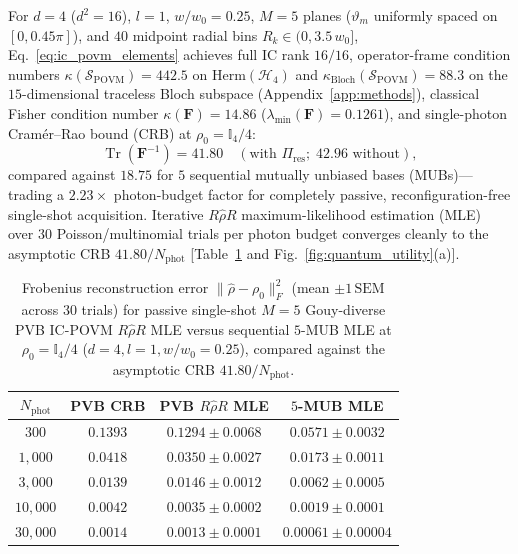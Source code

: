 \documentclass[aps,pra,onecolumn,notitlepage,11pt,tightenlines,nofootinbib,floatfix,longbibliography]{revtex4-2}
\newcommand{\norm}[1]{\lVert #1 \rVert}
\begin{document}
For $d = 4$ ($d^2 = 16$), $l = 1$, $w/w_0 = 0.25$, $M = 5$ planes ($\vartheta_m$ uniformly spaced on $[0, 0.45\pi]$), and $40$ midpoint radial bins $R_k \in (0, 3.5\,w_0]$, Eq.~\eqref{eq:ic_povm_elements} achieves full IC rank $16/16$, operator-frame condition numbers $\kappa(\mathcal{S}_{\mathrm{POVM}}) = 442.5$ on $\mathrm{Herm}(\mathcal{H}_4)$ and $\kappa_{\mathrm{Bloch}}(\mathcal{S}_{\mathrm{POVM}}) = 88.3$ on the $15$-dimensional traceless Bloch subspace (Appendix~\ref{app:methods}), classical Fisher condition number $\kappa(\mathbf{F}) = 14.86$ ($\lambda_{\min}(\mathbf{F}) = 0.1261$), and single-photon Cram\'er--Rao bound (CRB) at $\rho_0 = \mathbb{I}_4/4$:
\begin{equation}
\operatorname{Tr}\!\left(\mathbf{F}^{-1}\right) = 41.80 \quad (\text{with }\Pi_{\mathrm{res}};\; 42.96\text{ without}),
\label{eq:fisher_crb}
\end{equation}
compared against $18.75$ for $5$ sequential mutually unbiased bases (MUBs)---trading a $2.23\times$ photon-budget factor for completely passive, reconfiguration-free single-shot acquisition. Iterative $R\hat{\rho}R$ maximum-likelihood estimation (MLE)~\cite{Lvovsky2004} over $30$ Poisson/multinomial trials per photon budget converges cleanly to the asymptotic CRB $41.80/N_{\mathrm{phot}}$ [Table~\ref{tab:povm_mle} and Fig.~\ref{fig:quantum_utility}(a)].

\begin{table}[t]
\caption{Frobenius reconstruction error $\norm{\hat{\rho} - \rho_0}_F^2$ (mean $\pm 1\,\mathrm{SEM}$ across $30$ trials) for passive single-shot $M = 5$ Gouy-diverse PVB IC-POVM $R\hat{\rho}R$ MLE versus sequential $5$-MUB MLE at $\rho_0 = \mathbb{I}_4/4$ ($d = 4, l = 1, w/w_0 = 0.25$), compared against the asymptotic CRB $41.80/N_{\mathrm{phot}}$.}
\label{tab:povm_mle}
\begin{ruledtabular}
\setlength{\tabcolsep}{4pt}
\begin{tabular}{cccc}
$N_{\mathrm{phot}}$ & PVB CRB & PVB $R\hat{\rho}R$ MLE & $5$-MUB MLE \\
\hline
$300$ & $0.1393$ & $0.1294\pm 0.0068$ & $0.0571\pm 0.0032$ \\
$1{,}000$ & $0.0418$ & $0.0350\pm 0.0027$ & $0.0173\pm 0.0011$ \\
$3{,}000$ & $0.0139$ & $0.0146\pm 0.0012$ & $0.0062\pm 0.0005$ \\
$10{,}000$ & $0.0042$ & $0.0035\pm 0.0002$ & $0.0019\pm 0.0001$ \\
$30{,}000$ & $0.0014$ & $0.0013\pm 0.0001$ & $0.00061\pm 0.00004$ \\
\end{tabular}
\end{ruledtabular}
\end{table}
\end{document}
